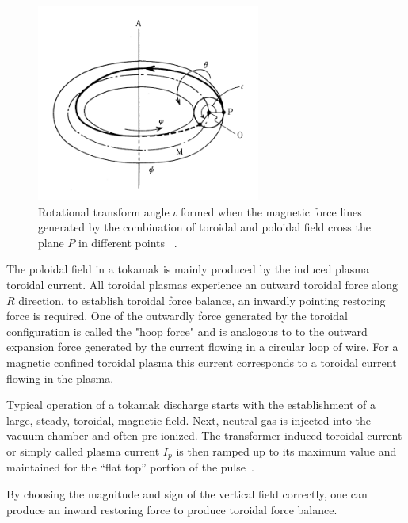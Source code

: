 \begin{figure}
	\centering
	\includegraphics[width=0.655\textwidth]{Chp1/rotational_angle.png}
	\caption{Rotational transform angle $\iota$ formed when the magnetic force lines generated by the combination of toroidal and poloidal field cross the plane $P$ in different points  ~\cite[Chapter~3]{Miyamoto2011}. \label{rot_angle}}
\end{figure}

The poloidal field in a tokamak is mainly produced by the induced plasma toroidal current.  All toroidal plasmas experience an outward toroidal force along $R$ direction, to establish toroidal force balance,  an inwardly pointing restoring force is required. One of the outwardly force generated by the toroidal configuration is called the "hoop force" and is analogous to  to the outward expansion force generated by the current flowing in a circular loop of wire. For a magnetic confined toroidal plasma this current corresponds to a toroidal current flowing in the plasma. 






Typical operation of a tokamak discharge starts with the establishment of a large, steady, toroidal, magnetic field. Next, neutral gas is injected into the vacuum chamber and often pre-ionized. The transformer induced toroidal current or simply called plasma current $I_p$ is then ramped up to its maximum value and maintained for the “flat top” portion of the pulse~\cite[Chapter~13]{Freidberg2007}.\smallskip

By choosing the magnitude and sign of the vertical field correctly, one can produce an inward restoring force to produce toroidal force balance.


